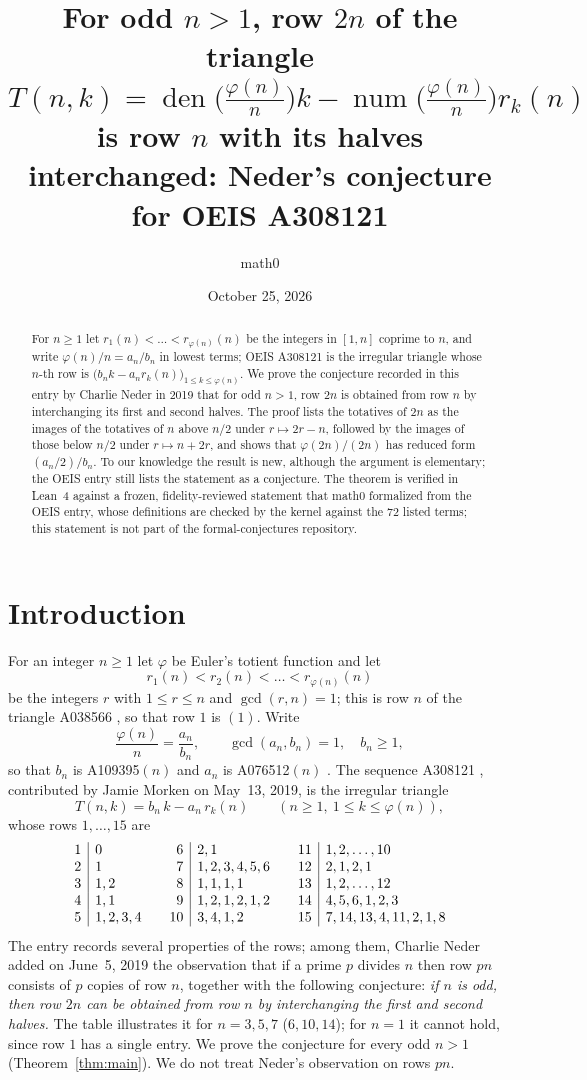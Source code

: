 \documentclass[11pt]{amsart}
\title[Neder's conjecture for OEIS A308121]{For odd $n>1$, row $2n$ of the triangle $T(n,k)=\operatorname{den}\bigl(\tfrac{\varphi(n)}{n}\bigr)k-\operatorname{num}\bigl(\tfrac{\varphi(n)}{n}\bigr)r_k(n)$ is row $n$ with its halves interchanged: Neder's conjecture for OEIS A308121}
\author{math0}
\date{October 25, 2026}
\theoremstyle{plain}
\theoremstyle{definition}
\begin{document}
\begin{abstract}
For $n\ge1$ let $r_1(n)<\dots<r_{\varphi(n)}(n)$ be the integers in $[1,n]$ coprime to $n$, and write $\varphi(n)/n=a_n/b_n$ in lowest terms; OEIS A308121 is the irregular triangle whose $n$-th row is $\bigl(b_nk-a_nr_k(n)\bigr)_{1\le k\le\varphi(n)}$.
We prove the conjecture recorded in this entry by Charlie Neder in 2019 that for odd $n>1$, row $2n$ is obtained from row $n$ by interchanging its first and second halves.
The proof lists the totatives of $2n$ as the images of the totatives of $n$ above $n/2$ under $r\mapsto 2r-n$, followed by the images of those below $n/2$ under $r\mapsto n+2r$, and shows that $\varphi(2n)/(2n)$ has reduced form $(a_n/2)/b_n$.
To our knowledge the result is new, although the argument is elementary; the OEIS entry still lists the statement as a conjecture.
The theorem is verified in Lean~4 against a frozen, fidelity-reviewed statement that math0 formalized from the OEIS entry, whose definitions are checked by the kernel against the $72$ listed terms; this statement is not part of the formal-conjectures repository.
\end{abstract}
\maketitle

\section{Introduction}

For an integer $n\ge1$ let $\varphi$ be Euler's totient function and let
\[
  r_1(n)<r_2(n)<\dots<r_{\varphi(n)}(n)
\]
be the integers $r$ with $1\le r\le n$ and $\gcd(r,n)=1$; this is row $n$ of the triangle A038566 \cite{A038566}, so that row $1$ is $(1)$. Write
\[
  \frac{\varphi(n)}{n}=\frac{a_n}{b_n},\qquad \gcd(a_n,b_n)=1,\quad b_n\ge1,
\]
so that $b_n$ is A109395$(n)$ \cite{A109395} and $a_n$ is A076512$(n)$ \cite{A076512}.
The sequence A308121 \cite{A308121}, contributed by Jamie Morken on May~13, 2019, is the irregular triangle
\[
  T(n,k)=b_n\,k-a_n\,r_k(n)\qquad(n\ge1,\ 1\le k\le\varphi(n)),
\]
whose rows $1,\dots,15$ are
\[
\begin{array}{r|l@{\qquad}r|l@{\qquad}r|l}
 1&0 & 6&2,1 & 11&1,2,\dots,10\\
 2&1 & 7&1,2,3,4,5,6 & 12&2,1,2,1\\
 3&1,2 & 8&1,1,1,1 & 13&1,2,\dots,12\\
 4&1,1 & 9&1,2,1,2,1,2 & 14&4,5,6,1,2,3\\
 5&1,2,3,4 & 10&3,4,1,2 & 15&7,14,13,4,11,2,1,8
\end{array}
\]
The entry records several properties of the rows; among them, Charlie Neder added on June~5, 2019 the observation that if a prime $p$ divides $n$ then row $pn$ consists of $p$ copies of row $n$, together with the following conjecture: \emph{if $n$ is odd, then row $2n$ can be obtained from row $n$ by interchanging the first and second halves.}
The table illustrates it for $n=3,5,7$ ($6,10,14$); for $n=1$ it cannot hold, since row $1$ has a single entry.
We prove the conjecture for every odd $n>1$ (Theorem~\ref{thm:main}).
We do not treat Neder's observation on rows $pn$.
\end{document}
